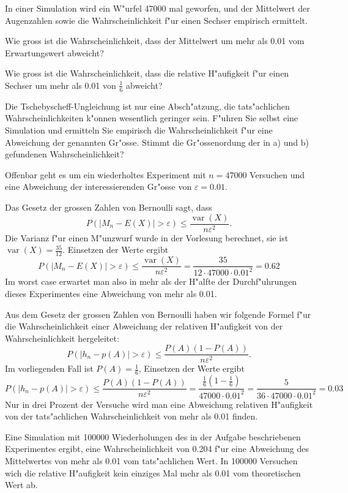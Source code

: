 In einer Simulation wird ein W"urfel 47000 mal geworfen, und der Mittelwert
der Augenzahlen sowie die Wahrscheinlichkeit f"ur einen Sechser empirisch
ermittelt.

\begin{teilaufgaben}
\item Wie gross ist die Wahrscheinlichkeit, dass der Mittelwert um mehr
als 0.01 vom Erwartungswert abweicht?
\item Wie gross ist die Wahrscheinlichkeit, dass die relative H"aufigkeit
f"ur einen Sechser um mehr als 0.01 von $\frac16$ abweicht?
\item Die Tschebyscheff-Ungleichung ist nur eine Absch"atzung, die
tats"achlichen Wahrscheinlichkeiten k"onnen wesentlich geringer sein.
F"uhren Sie selbst eine Simulation und ermitteln Sie empirisch die
Wahrscheinlichkeit f"ur eine Abweichung der genannten Gr"osse. 
Stimmt die Gr"ossenordung der in a) und b) gefundenen Wahrscheinlichkeit?
\end{teilaufgaben}


\begin{loesung}
Offenbar geht es um ein wiederholtes Experiment mit $n=47000$ Versuchen
und eine Abweichung der interessierenden Gr"osse von $\varepsilon=0.01$.
\begin{teilaufgaben}
\item
Das Gesetz der grossen Zahlen von Bernoulli sagt, dass 
\[
P(|M_n-E(X)|>\varepsilon) \le
\frac{\operatorname{var}(X)}{n\varepsilon^2}.
\]
Die Varianz f"ur einen M"unzwurf wurde in der Vorlesung berechnet, sie ist
$\operatorname{var}(X)=\frac{35}{12}.$
Einsetzen der Werte ergibt
\[
P(|M_n-E(X)|>\varepsilon)\le
\frac{\operatorname{var}(X)}{n\varepsilon^2}
=\frac{35}{12\cdot 47000\cdot 0.01^2}=0.62
\]
Im worst case erwartet man also in mehr als der H"alfte der Durchf"uhrungen
dieses Experimentes eine Abweichung von mehr als  0.01.
\item
Aus dem Gesetz der grossen Zahlen von Bernoulli haben wir folgende Formel
f"ur die Wahrscheinlichkeit einer Abweichung der relativen H"aufigkeit von
der Wahrscheinlichkeit hergeleitet:
\[
P(|h_n-p(A)|>\varepsilon)\le \frac{P(A)(1-P(A))}{n\varepsilon^2}.
\]
Im vorliegenden Fall ist $P(A)=\frac16$, Einsetzen der Werte ergibt
\[
P(|h_n-p(A)|>\varepsilon)\le \frac{P(A)(1-P(A))}{n\varepsilon^2}
=\frac{\frac16(1-\frac16)}{47000\cdot 0.01^2}
=\frac{5}{36\cdot 47000\cdot 0.01^2}
=0.03
\]
Nur in drei Prozent der Versuche wird man eine Abweichung relativen
H"aufigkeit von der tats"achlichen Wahrscheinlichkeit von mehr als 0.01
finden.
\item Eine Simulation mit 100000 Wiederholungen des in der Aufgabe
beschriebenen Experimentes ergibt, eine Wahrscheinlichkeit von 0.204
f"ur eine Abweichung des Mittelwertes von mehr als 0.01 vom tats"achlichen
Wert. In 100000 Versuchen wich die relative H"aufigkeit kein einziges
Mal mehr als 0.01 vom theoretischen Wert ab.
\end{teilaufgaben}
\end{loesung}


